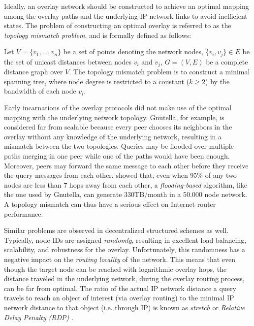 Ideally, an overlay network should be constructed to achieve an optimal 
mapping among the overlay paths and the underlying IP network links to avoid
inefficient states. The problem of constructing an optimal overlay is referred
to as the \emph{topology mismatch problem}, and is formally defined as follows:
\begin{definition}
Let $V = \{v_1, ..., v_n\}$ be a set of points denoting the network nodes,
$\{v_i, v_j\} \in E$ be the set of unicast distances between nodes $v_i$ and
$v_j$, $G=(V,E)$ be a complete distance graph over $V$. The topology mismatch
problem is to construct a minimal spanning tree, where node degree is
restricted to a constant ($k\geq 2$) by the bandwidth of each node $v_i$.
\end{definition}

Early incarnations of the overlay protocols did not make use of the optimal
mapping with the underlying network topology. Gnutella, for example, is
considered far from scalable \cite{ritter_gnucantscale_2001} because every peer
chooses its neighbors in the overlay without any knowledge of the underlying
network, resulting in a mismatch between the two topologies. Queries may be
flooded over multiple paths merging in one peer while one of the paths would
have been enough. Moreover, peers may forward the same message to each other
before they receive the query messages from each other.
\cite{matei_mapgnutella_2002} showed that, even when 95\% of any two nodes are
less than 7 hops away from each other, a \emph{flooding-based} algorithm, like
the one used by Gnutella, can generate 330TB/month in a 50.000 node network. A
topology mismatch can thus have a serious effect on Internet router performance.

Similar problems are observed in decentralized structured schemes as well.
Typically, node IDs are assigned \emph{randomly}, resulting in excellent load
balancing, scalability, and robustness for the overlay. Unfortunately, this
randomness has a negative impact on the \emph{routing locality} of the network.
This means that even though the target node can be reached with logarithmic
overlay hops, the distance traveled in the underlying network, during the
overlay routing process, can be far from optimal.  The ratio of the actual IP
network distance a query travels to reach an object of interest (via overlay
routing) to the minimal IP network distance to that object (i.e. through IP) is
known as \emph{stretch} or \emph{Relative Delay Penalty (RDP)} \cite{CRZ2000}.

